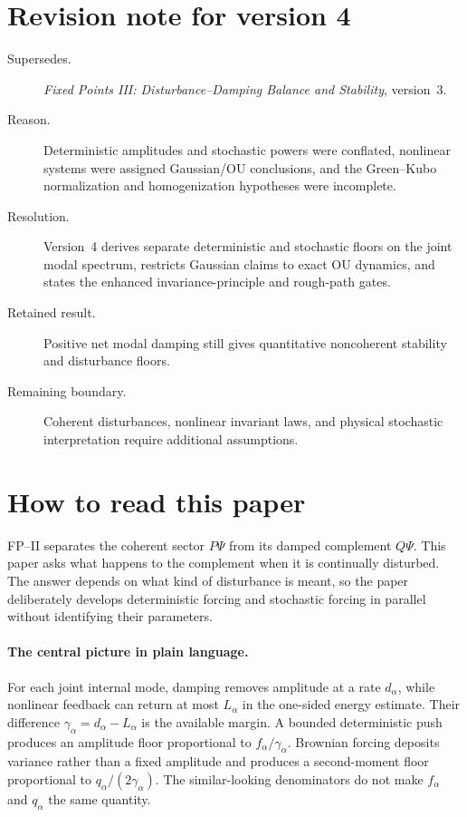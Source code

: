 \documentclass[11pt]{article}
\begin{document}
\section*{Revision note for version 4}
\begin{description}
\item[Supersedes.] \emph{Fixed Points III: Disturbance--Damping Balance and
Stability}, version~3.
\item[Reason.] Deterministic amplitudes and stochastic powers were conflated,
nonlinear systems were assigned Gaussian/OU conclusions, and the Green--Kubo
normalization and homogenization hypotheses were incomplete.
\item[Resolution.] Version~4 derives separate deterministic and stochastic
floors on the joint modal spectrum, restricts Gaussian claims to exact OU
dynamics, and states the enhanced invariance-principle and rough-path gates.
\item[Retained result.] Positive net modal damping still gives quantitative
noncoherent stability and disturbance floors.
\item[Remaining boundary.] Coherent disturbances, nonlinear invariant laws,
and physical stochastic interpretation require additional assumptions.
\end{description}

\section*{How to read this paper}
FP--II separates the coherent sector $P\Psi$ from its damped complement
$Q\Psi$.  This paper asks what happens to the complement when it is continually
disturbed.  The answer depends on what kind of disturbance is meant, so the
paper deliberately develops deterministic forcing and stochastic forcing in
parallel without identifying their parameters.

\paragraph{The central picture in plain language.}
For each joint internal mode, damping removes amplitude at a rate
$d_\alpha$, while nonlinear feedback can return at most
$L_\alpha$ in the one-sided energy estimate.  Their difference
$\gamma_\alpha=d_\alpha-L_\alpha$ is the available margin.  A bounded
deterministic push produces an amplitude floor proportional to
$f_\alpha/\gamma_\alpha$.  Brownian forcing deposits variance rather than a
fixed amplitude and produces a second-moment floor proportional to
$q_\alpha/(2\gamma_\alpha)$.  The similar-looking denominators do not make
$f_\alpha$ and $q_\alpha$ the same quantity.
\end{document}
